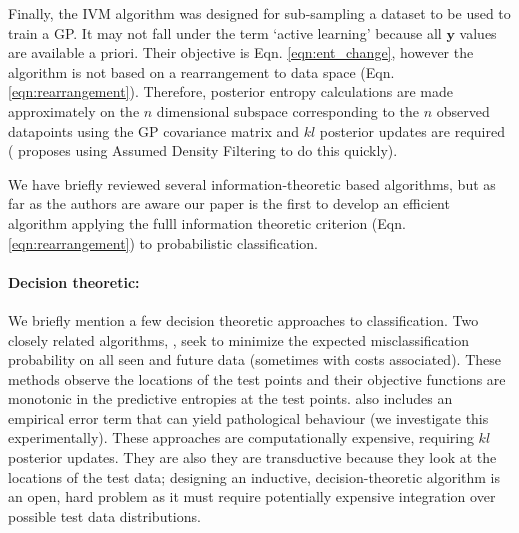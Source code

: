 \documentclass{article}
\newcommand{\y}{\bm{y}}
\begin{document}
Finally, the IVM \cite{lawrence2004} algorithm was designed for sub-sampling a dataset to be used to train a GP. It may not fall under the term `active learning' because all $\y$ values are available a priori. Their objective is Eqn. \eqref{eqn:ent_change}, however the algorithm is not based on a rearrangement to data space (Eqn. \eqref{eqn:rearrangement}). Therefore, posterior entropy calculations are made approximately on the $n$ dimensional subspace corresponding to the $n$ observed datapoints using the GP covariance matrix and $kl$ posterior updates are required (\cite{lawrence2004} proposes using Assumed Density Filtering to do this quickly).

We have briefly reviewed several information-theoretic based algorithms, but as far as the authors are aware our paper is the first to develop an efficient algorithm applying the fulll information theoretic criterion (Eqn. \eqref{eqn:rearrangement}) to probabilistic classification.

\paragraph{Decision theoretic:} We briefly mention a few decision theoretic approaches to classification. Two closely related algorithms, \cite{kapoor2007, zhu2003}, seek to minimize the expected misclassification probability on all seen and future data (sometimes with costs associated). These methods observe the locations of the test points and their objective functions are monotonic in the predictive entropies at the test points. \cite{kapoor2007} also includes an empirical error term that can yield pathological behaviour (we investigate this experimentally). These approaches are computationally expensive, requiring $kl$ posterior updates. They are also they are transductive because they look at the locations of the test data; designing an inductive, decision-theoretic algorithm  is an open, hard problem as it must require potentially expensive integration over possible test data distributions.
\end{document}
